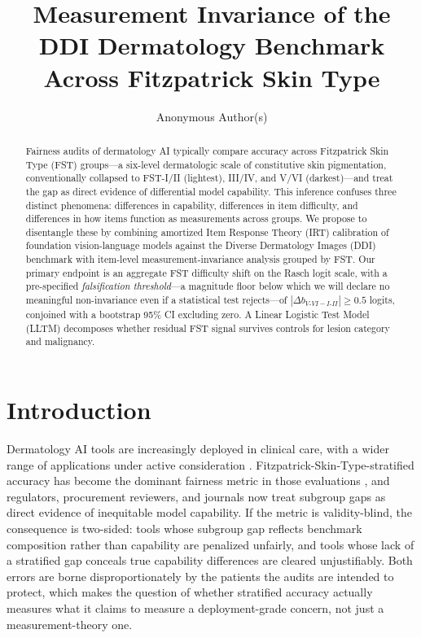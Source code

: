 \documentclass{article}
\title{Measurement Invariance of the DDI Dermatology Benchmark Across Fitzpatrick Skin Type}
\author{%
  Anonymous Author(s) \\
}
\begin{document}
\maketitle

\begin{abstract}
Fairness audits of dermatology AI typically compare accuracy across Fitzpatrick Skin Type (FST) groups---a six-level dermatologic scale of constitutive skin pigmentation, conventionally collapsed to FST-I/II (lightest), III/IV, and V/VI (darkest)---and treat the gap as direct evidence of differential model capability. This inference confuses three distinct phenomena: differences in capability, differences in item difficulty, and differences in how items function as measurements across groups. We propose to disentangle these by combining amortized Item Response Theory (IRT) calibration of foundation vision-language models against the Diverse Dermatology Images (DDI) benchmark with item-level measurement-invariance analysis grouped by FST. Our primary endpoint is an aggregate FST difficulty shift on the Rasch logit scale, with a pre-specified \emph{falsification threshold}---a magnitude floor below which we will declare no meaningful non-invariance even if a statistical test rejects---of $|\Delta b_{V\text{-}VI - I\text{-}II}| \geq 0.5$ logits, conjoined with a bootstrap 95\% CI excluding zero. A Linear Logistic Test Model (LLTM) decomposes whether residual FST signal survives controls for lesion category and malignancy.
\end{abstract}

\section{Introduction}
\label{sec:intro}

Dermatology AI tools are increasingly deployed in clinical care, with a wider range of applications under active consideration \citep{daneshjou2022disparities}. Fitzpatrick-Skin-Type-stratified accuracy has become the dominant fairness metric in those evaluations \citep{daneshjou2022disparities, groh2021evaluating}, and regulators, procurement reviewers, and journals now treat subgroup gaps as direct evidence of inequitable model capability. If the metric is validity-blind, the consequence is two-sided: tools whose subgroup gap reflects benchmark composition rather than capability are penalized unfairly, and tools whose lack of a stratified gap conceals true capability differences are cleared unjustifiably. Both errors are borne disproportionately by the patients the audits are intended to protect, which makes the question of whether stratified accuracy actually measures what it claims to measure a deployment-grade concern, not just a measurement-theory one.
\end{document}
